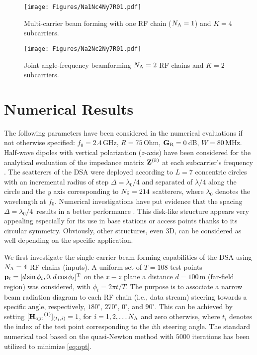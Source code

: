 \documentclass[10pt, final, twocolumn, twoside, romanappendices]{IEEEtran}
\begin{document}
\begin{figure}[t]
  \centering
  \texttt{[image: Figures/Na1Nc4Ny7R01.pdf]}
  \caption{Multi-carrier beam forming with one \ac{RF} chain ($N_{\text{A}}=1$) and $K=4$ subcarriers.}
  \label{Fig:PatternDSAColor}
\end{figure}

\begin{figure}[t]
  \centering
  \texttt{[image: Figures/Na2Nc2Ny7R01.pdf]}
  \caption{Joint angle-frequency beamforming  $N_{\text{A}}=2$ \ac{RF} chains and $K=2$ subcarriers.}
  \label{Fig:PatternHybrid}
\end{figure}
  

\section{Numerical Results}

The following parameters have been considered in the numerical evaluations if not otherwise specified: $f_0=2.4\,$GHz,  $R=75\,$Ohm, $\mathbf{G}_{\text{R}}=0\,$dB, $W=80\,$MHz. 
 Half-wave dipoles with vertical polarization ($z$-axis) have been considered for the analytical evaluation of the impedance matrix ${\bf{Z}}^{(k)}$ at each subcarrier's frequency \cite{BalB:16}. 
%
The scatterers of the \ac{DSA} were deployed according to $L=7$ concentric circles with an incremental radius of step  $\Delta=\lambda_0/4$ and separated of $\lambda/4$ along the circle and the $y$ axis corresponding to $N_{\text{S}}=214$ scatterers, where $\lambda_0$ denotes the wavelength at $f_0$. Numerical investigations have put evidence that the spacing $\Delta=\lambda_0/4\,$ results in a better performance   \cite{Dar:C24}.  
This disk-like structure appears very appealing especially for its use in base stations or access points thanks to its circular symmetry. 
Obviously, other structures, even 3D, can be considered as well depending on the specific application. 

We first investigate the single-carrier beam forming capabilities of the \ac{DSA} using $N_{\text{A}}=4$ \ac{RF} chains (inputs). 
A uniform set of $T=108$  test points ${\bf{p}}_t=[d\sin \phi_t ,0 ,d \cos \phi_t]^{\mathrm{T}}$ on the $x-z$ plane a distance $d=100\,$m (far-field region) was considered, with $\phi_t=2 \pi t / T$.
The purpose is to associate a narrow beam radiation diagram to each \ac{RF} chain (i.e., data stream) steering towards a specific angle, respectively,  $180^{\circ}$, $270^{\circ}$, $0^{\circ}$, and $90^{\circ}$.  
This can be achieved  by setting   $[{\bf{H}_{\mathrm{opt}}}^{(1)}]_{(t_i,i)}=1$, for $i=1,2, \ldots N_{\text{A}}$ and zero otherwise, where $t_i$ denotes the index of the test point corresponding to the $i$th steering angle.   
The standard numerical tool based on the quasi-Newton method %
with $5000$ iterations has been utilized to minimize \eqref{eq:opt}.
\end{document}
